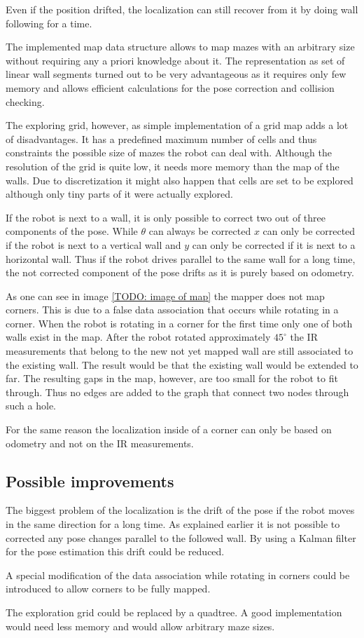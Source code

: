 Even if the position drifted, the localization can still recover from it by doing wall following for a time.

The implemented map data structure allows to map mazes with an arbitrary size without requiring any a priori knowledge about it. The representation as set of linear wall segments turned out to be very advantageous as it requires only few memory and allows efficient calculations for the pose correction and collision checking. 

The exploring grid, however, as simple implementation of a grid map adds a lot of disadvantages. It has a predefined maximum number of cells and thus constraints the possible size of mazes the robot can deal with. Although the resolution of the grid is quite low, it needs more memory than the map of the walls. Due to discretization it might also happen that cells are set to be explored although only tiny parts of it were actually explored.

If the robot is next to a wall, it is only possible to correct two out of three components of the pose. While $\theta$ can always be corrected $x$ can only be corrected if the robot is next to a vertical wall and $y$ can only be corrected if it is next to a horizontal wall. Thus if the robot drives parallel to the same wall for a long time, the not corrected component of the pose drifts as it is purely based on odometry.

As one can see in image \ref{TODO: image of map} the mapper does not map corners. This is due to a false data association that occurs while rotating in a corner. When the robot is rotating in a corner for the first time only one of both walls exist in the map. After the robot rotated approximately $45^{\circ}$ the IR measurements that belong to the new not yet mapped wall are still associated to the existing wall. The result would be that the existing wall would be extended to far. The resulting gaps in the map, however, are too small for the robot to fit through. Thus no edges are added to the graph that connect two nodes through such a hole.

For the same reason the localization inside of a corner can only be based on odometry and not on the IR measurements.

\subsection{Possible improvements}

The biggest problem of the localization is the drift of the pose if the robot moves in the same direction for a long time. As explained earlier it is not possible to corrected any pose changes parallel to the followed wall. By using a Kalman filter for the pose estimation this drift could be reduced.

A special modification of the data association while rotating in corners could be introduced to allow corners to be fully mapped.

The exploration grid could be replaced by a quadtree. A good implementation would need less memory and would allow arbitrary maze sizes.



